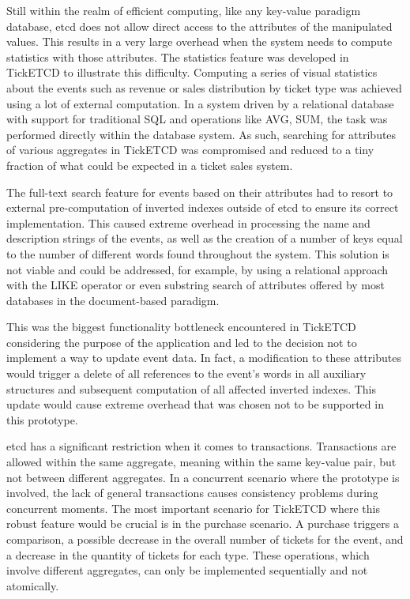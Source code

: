 \documentclass[screen,review]{acmart}
\begin{document}
Still within the realm of efficient computing, like any key-value paradigm database, etcd does not allow direct access to the attributes of the manipulated values. This results in a very large overhead when the system needs to compute statistics with those attributes. The statistics feature was developed in TickETCD to illustrate this difficulty. Computing a series of visual statistics about the events such as revenue or sales distribution by ticket type was achieved using a lot of external computation. In a system driven by a relational database with support for traditional SQL and operations like AVG, SUM, the task was performed directly within the database system.
As such, searching for attributes of various aggregates in TickETCD was compromised and reduced to a tiny fraction of what could be expected in a ticket sales system.

The full-text search feature for events based on their attributes had to resort to external pre-computation of inverted indexes outside of etcd to ensure its correct implementation. This caused extreme overhead in processing the name and description strings of the events, as well as the creation of a number of keys equal to the number of different words found throughout the system. This solution is not viable and could be addressed, for example, by using a relational approach with the LIKE operator or even substring search of attributes offered by most databases in the document-based paradigm.

This was the biggest functionality bottleneck encountered in TickETCD considering the purpose of the application and led to the decision not to implement a way to update event data. In fact, a modification to these attributes would trigger a delete of all references to the event's words in all auxiliary structures and subsequent computation of all affected inverted indexes. This update would cause extreme overhead that was chosen not to be supported in this prototype.

etcd has a significant restriction when it comes to transactions. Transactions are allowed within the same aggregate, meaning within the same key-value pair, but not between different aggregates. In a concurrent scenario where the prototype is involved, the lack of general transactions causes consistency problems during concurrent moments. The most important scenario for TickETCD where this robust feature would be crucial is in the purchase scenario. A purchase triggers a comparison, a possible decrease in the overall number of tickets for the event, and a decrease in the quantity of tickets for each type. These operations, which involve different aggregates, can only be implemented sequentially and not atomically.
\end{document}
